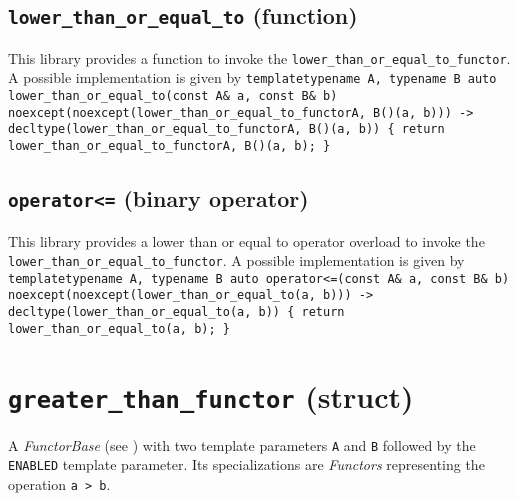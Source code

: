 \documentclass[oneside]{book}
\begin{document}
\subsection{\texttt{lower\_than\_or\_equal\_to} (function)}
This library provides a function to invoke the \texttt{lower\_than\_or\_equal\_to\_functor}.
A possible implementation is given by\newline
\texttt{template\textlangle typename A, typename B\textrangle\newline
auto\newline
lower\_than\_or\_equal\_to(const A\& a, const B\& b)\newline
noexcept(noexcept(lower\_than\_or\_equal\_to\_functor\textlangle A, B\textrangle()(a, b)))\newline
-> decltype(lower\_than\_or\_equal\_to\_functor\textlangle A, B\textrangle()(a, b))\newline
\{ return lower\_than\_or\_equal\_to\_functor\textlangle A, B\textrangle()(a, b); \}}

\subsection{\texttt{operator<=} (binary operator)}
This library provides a lower than or equal to operator overload to invoke the \texttt{lower\_than\_or\_equal\_to\_functor}.
A possible implementation is given by\newline
\texttt{template\textlangle typename A, typename B\textrangle\newline
auto\newline
operator<=(const A\& a, const B\& b)\newline
noexcept(noexcept(lower\_than\_or\_equal\_to(a, b)))\newline
-> decltype(lower\_than\_or\_equal\_to(a, b))\newline
\{ return lower\_than\_or\_equal\_to(a, b); \}}

\section{\texttt{greater\_than\_functor} (struct)}
A \textit{FunctorBase} (see \cite{functors}) with two template parameters \texttt{A} and \texttt{B} followed by the \texttt{ENABLED} template parameter.
Its specializations are \textit{Functors} representing the operation \texttt{a > b}.
\end{document}
